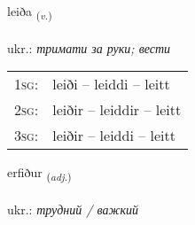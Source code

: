 \documentclass[frontgrid, backgrid]{flacards}\usepackage[]{graphicx}\usepackage[]{xcolor}
\begin{document}
\renewcommand{\flhead}{\vskip5pt \fboxsep=0pt {\small\bfseries\footnotesize Sagnorð | дієслово}}
\renewcommand{\fcfoot}{\vskip5pt \fboxsep=0pt \hspace{2pt}{\small\bfseries\footnotesize 1K}}

\renewcommand{\blhead}{\vskip5pt {\small\bfseries\footnotesize Sagnorð | дієслово }}
\renewcommand{\bcfoot}{\vskip5pt \hspace{2pt}{\small\bfseries\footnotesize 1K}}


{leiða \small{\textsubscript{(\textit{v.})}} \\[1ex] %
\textphonetic{[leiːða]} \\
ukr.: \emph{тримати за руки; вести} \\  [2ex]
\renewcommand*{\arraystretch}{0.8}
\begin{tabular}{p{1cm}l}
\textsc{1sg}: & leiði -- leiddi -- leitt \\ 
\textsc{2sg}: & leiðir -- leiddir -- leitt \\ 
\textsc{3sg}: & leiðir -- leiddi -- leitt \\ 
\end{tabular}
}

\renewcommand{\flhead}{\vskip5pt \fboxsep=0pt {\small\bfseries\footnotesize Lýsingarorð | прикметник}}
\renewcommand{\fcfoot}{\vskip5pt \fboxsep=0pt \hspace{2pt}{\small\bfseries\footnotesize 1K}}

\renewcommand{\blhead}{\vskip5pt {\small\bfseries\footnotesize Lýsingarorð | прикметник }}
\renewcommand{\bcfoot}{\vskip5pt \hspace{2pt}{\small\bfseries\footnotesize 1K}}


{erfiður \small{\textsubscript{(\textit{adj.})}} \\[1ex] %
\textphonetic{[ɛrvɪðʏr]} \\
ukr.: \emph{трудний / важкий} \\  [2ex]
\renewcommand*{\arraystretch}{0.8}
}
\end{document}
